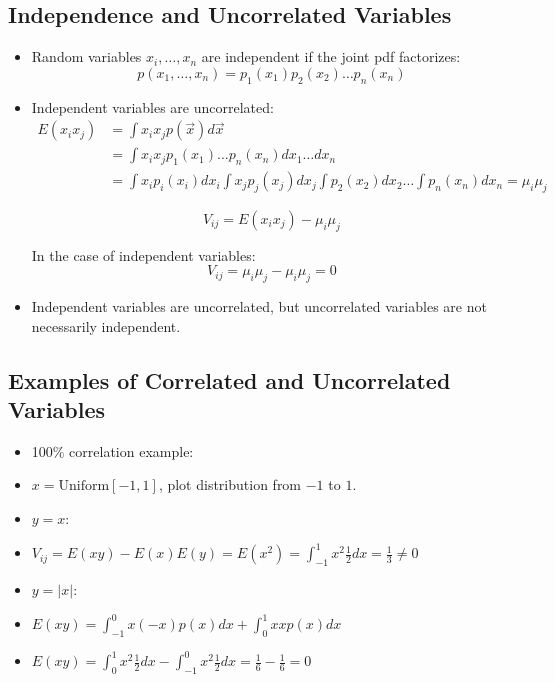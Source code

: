 \subsection{Independence and Uncorrelated Variables}
\begin{itemize}
    \item Random variables $x_i, \dots, x_n$ are independent if the joint pdf factorizes:
          \[ p(x_1, \ldots, x_n) = p_1(x_1) p_2(x_2) \ldots p_n(x_n) \]
    \item Independent variables are uncorrelated:
          \begin{align*}
              E(x_i x_j) & = \int x_i x_j p(\vec{x}) d \vec{x}                                                                        \\
                         & = \int x_i x_j p_1(x_1) \ldots p_n(x_n) dx_1 \ldots dx_n                                                   \\
                         & = \int x_i p_i(x_i) dx_i \int x_j p_j(x_j) dx_j \int p_2(x_2) dx_2 \ldots \int p_n(x_n) dx_n = \mu_i \mu_j
          \end{align*}

          \[ V_{ij} = E(x_i x_j) - \mu_i \mu_j \]

          In the case of independent variables:
          \[ V_{ij} = \mu_i \mu_j - \mu_i \mu_j = 0 \]

    \item Independent variables are uncorrelated, but uncorrelated variables are not necessarily independent.
\end{itemize}

\subsection{Examples of Correlated and Uncorrelated Variables}
\begin{itemize}
    \item 100\% correlation example:
    \item $x = \text{Uniform}[-1, 1]$, plot distribution from $-1$ to $1$.
    \item $y = x$:
    \item $V_{ij} = E(xy) - E(x)E(y) = E(x^2) = \int_{-1}^{1} x^2 \frac{1}{2} dx = \frac{1}{3} \neq 0$
    \item $y = |x|$:
    \item $E(xy) = \int_{-1}^{0} x(-x) p(x) dx + \int_0^{1} x x p(x) dx$
    \item $E(xy) = \int_0^{1} x^2 \frac{1}{2} dx - \int_{-1}^{0} x^2 \frac{1}{2} dx = \frac{1}{6} - \frac{1}{6} = 0$
\end{itemize}

